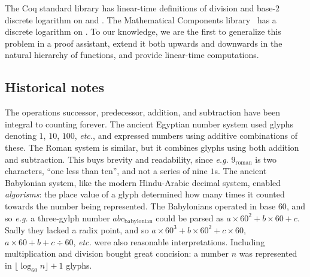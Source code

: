 
%

The Coq standard library has linear-time definitions
of division and base-$2$ discrete logarithm on  and .
The Mathematical Components library~\cite{MathComp}
has a discrete logarithm on .
To our knowledge, we are the first to generalize this
problem in a proof assistant, extend it both
upwards and downwards in the natural hierarchy of functions, and
provide linear-time computations.

\subsection{Historical notes}

The operations successor, predecessor, addition, and subtraction have
been integral to counting forever. The ancient Egyptian
number system used glyphs denoting $1$, $10$, $100$, \emph{etc.},
and expressed numbers using additive combinations of these.
The Roman system is similar, but
it combines glyphs using both addition and subtraction.
This buys brevity and readability,
since \emph{e.g.} $9_{\text{roman}}$ is two characters, ``one less than ten'',
and not a series of nine $1$s.
The ancient Babylonian system, like the modern Hindu-Arabic decimal system,
enabled \emph{algorisms}: the place value of a glyph determined how many times it
counted towards the number being represented.
The Babylonians operated in
base $60$, and so \emph{e.g.} a three-gylph number $abc_{\text{babylonian}}$ could
be parsed as $a \times 60^2 + b \times 60 + c$. Sadly they lacked
a radix point, and so
$a \times 60^3 + b \times 60^2 + c \times 60$, $a \times 60 + b + c \div 60$,
\emph{etc.} were also reasonable interpretations.
Including multiplication and division bought great concision: a number $n$ was
represented in $\lfloor \log_{60}n \rfloor + 1$ glyphs.


